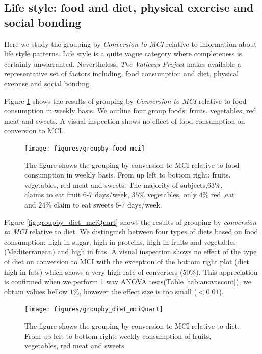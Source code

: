 \documentclass[11pt]{article}
\theoremstyle{definition}
\theoremstyle{remark}
\begin{document}
\subsection{Life style: food and diet, physical exercise and social bonding}

Here we study the grouping by \emph{Conversion to MCI} relative to information about life style patterns. Life style is a quite vague category where completeness is certainly unwarranted. Nevertheless, \emph{The Vallecas Project} makes available a representative set of factors including, food consumption and diet, physical exercise and social bonding.

Figure \ref{fig:groupby_food_mci} shows the results of grouping by \emph{Conversion to MCI} relative to food consumption in weekly basis. We outline four group foods: fruits, vegetables, red meat and sweets. A visual inspection shows no effect of food consumption on conversion to MCI. %

\begin{figure}[H]
        \centering
        \texttt{[image: figures/groupby\_food\_mci]}
        \caption{The figure shows the grouping by conversion to MCI relative to food consumption in weekly basis. From up left to bottom right: fruits, vegetables, red meat and sweets. The majority of subjects,$63\%$, claims to eat fruit 6-7 days/week, $35\%$ vegetables, only $4\%$ red ,eat and $24\%$ claim to eat sweets 6-7 days/week.} 
        \label{fig:groupby_food_mci}
\end{figure}

Figure \ref{fig:groupby_diet_mciQuart} shows the results of grouping by \emph{conversion to MCI} relative to diet. We distinguish between four types of diets based on food consumption: high in sugar, high in proteins, high in fruits and vegetables (Mediterranean) and high in fats. A visual inspection shows no effect of the type of diet on conversion to MCI with the exception of the bottom right plot (diet high in fats) which shows a very high rate of converters ($50\%$). This appreciation is confirmed when we perform 1 way ANOVA tests(Table \ref{tab:anovascont}), we obtain values bellow $1\%$, however the effect size is too small ($<0.01$). 
\begin{figure}[H]
        \centering
        \texttt{[image: figures/groupby\_diet\_mciQuart]}
        \caption{The figure shows the grouping by conversion to MCI relative to diet. From up left to bottom right: weekly consumption of fruits, vegetables, red meat and sweets.} 
        \label{fig:roupby_diet_mciQuart}
\end{figure}
\end{document}
